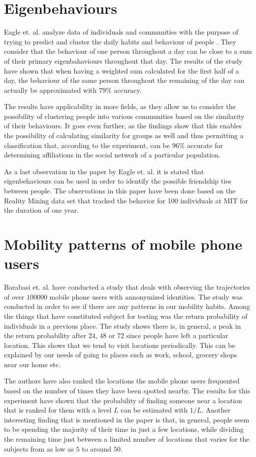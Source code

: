 \section{Eigenbehaviours}
Eagle et. al. analyze data of individuals and communities with the
purpose of trying to predict and cluster the daily habits and behaviour of
people \cite{Eagle09}. They consider that the behaviour of one person throughout
a day can be close to a sum of their primary eigenbahaviours throughout that day.
The results of the study have shown that when having a weighted sum calculated
for the first half of a day, the behaviour of the same person throughout the
remaining of the day can actually be approximated with $79\%$ accuracy.

The results have applicability in more fields, as they allow us to consider the
possibility of clustering people into various communities based on the
similarity of their behaviours. It goes even further, as the findings show that
this enables the possibility of calculating similarity for groups as well and
thus permitting a classification that, according to the experiment, can be
$96\%$ accurate for determining affiliations in the social network of a
particular population.

As a last observation in the paper by Eagle et. al. it is stated that
eigenbehaviours can be used in order to identify the possible friendship ties
between people. The observations in this paper have been done based on the
Reality Mining data set that tracked the behavior for 100 individuals at MIT for
the duration of one year.

\section{Mobility patterns of mobile phone users}
Barabasi et. al. have conducted a study \cite{Barabasi08} that deals with
observing the trajectories of over $100000$ mobile phone users with annonymized
identities. The study was conducted in order to see if there are any patterns in
our mobility habits. Among the things that have constituted subject for testing
was the return probability of individuals in a previous place. The study shows
there is, in general, a peak in the return probability after $24$, $48$ or $72$
since people have left a particular location. This shows that we tend to visit
locations periodically. This can be explained by our needs of going to places
such as work, school, grocery shops near our home etc.

The authors have also ranked the locations the mobile phone users frequented
based on the number of times they have been spotted nearby. The results for this
experiment have shown that the probability of finding someone near a location
that is ranked for them with a level $L$ can be estimated with $1/L$. Another
interesting finding that is mentioned in the paper is that, in general, people
seem to be spending the majority of their time in just a few locations, while
dividing the remaining time just between a limited number of locations that
varies for the subjects from as low as $5$ to around $50$.

